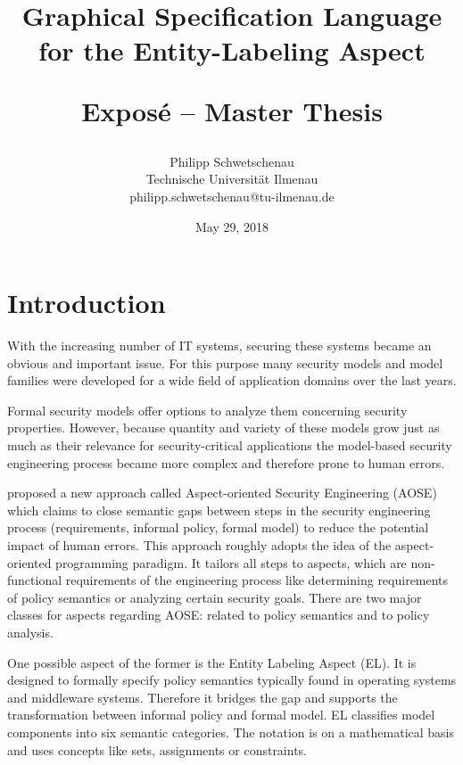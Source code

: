 \documentclass[12pt,a4paper]{article}
\begin{document}
\title{{\bf Graphical Specification Language \\for the Entity-Labeling Aspect} \\ 
\begin{large}Exposé -- Master Thesis\end{large}
}
\author{
	Philipp Schwetschenau \\
	Technische Universität Ilmenau \\
	philipp.schwetschenau@tu-ilmenau.de
}
\date{May 29, 2018}

\maketitle

\section{Introduction} 
With the increasing number of IT systems, securing these systems became an obvious and important issue.
For this purpose many security models and model families were developed for a wide field of application domains over the last years.

Formal security models offer options to analyze them concerning security properties.
However, because quantity and variety of these models grow just as much as their relevance for security-critical applications the model-based security engineering process became more complex and therefore prone to human errors.

\citet*{Amthor18} proposed a new approach called Aspect-oriented Security Engineering (AOSE) which claims to close semantic gaps between steps in the security engineering process (requirements, informal policy, formal model) to reduce the potential impact of human errors.
This approach roughly adopts the idea of the aspect-oriented programming paradigm.
It tailors all steps to aspects, which are non-functional requirements of the engineering process like determining requirements of policy semantics or analyzing certain security goals.
There are two major classes for aspects regarding AOSE: related to policy semantics and to policy analysis.

One possible aspect of the former is the Entity Labeling Aspect (EL).
It is designed to formally specify policy semantics typically found in operating systems and middleware systems.
Therefore it bridges the gap and supports the transformation between informal policy and formal model.
EL classifies model components into six semantic categories.
The notation is on a mathematical basis and uses concepts like sets, assignments or constraints.
\end{document}
